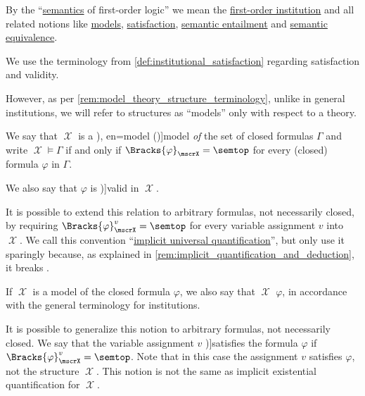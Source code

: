 \begin{definition}\label{def:fol_semantics}\mimprovised
  By the \enquote{\hyperref[con:syntax_semantics_duality]{semantics} of first-order logic} we mean the \hyperref[def:fol_institution]{first-order institution} and all related notions like \hyperref[def:institution/models]{models}, \hyperref[def:institution/satisfaction]{satisfaction}, \hyperref[def:institutional_entailment]{semantic entailment} and \hyperref[def:semantic_equivalence]{semantic equivalence}.

  \begin{thmenum}
     We use the terminology from \cref{def:institutional_satisfaction} regarding satisfaction and validity.

    However, as per \cref{rem:model_theory_structure_terminology}, unlike in general institutions, we will refer to structures as \enquote{models} only with respect to a theory.

    We say that \( \mscrX \) is a \term[ru=модель (\cite[2.6.21]{Герасимов2014Вычислимость}), en=model (\cite[def. def.2.2.13(ii)]{Hinman2005Logic})]{model} \emph{of} the set of closed formulas \( \Gamma \) and write \( \mscrX \vDash \Gamma \) if and only if \( \Bracks{\varphi}_\mscrX = \semtop \) for every (closed) formula \( \varphi \) in \( \Gamma \).

    We also say that \( \varphi \) is \term[en=valid (\cite[144]{VanDalen2004LogicAndStructure})]{valid} in \( \mscrX \).

    It is possible to extend this relation to arbitrary formulas, not necessarily closed, by requiring \( \Bracks{\varphi}_\mscrX^v = \semtop \) for every variable assignment \( v \) into \( \mscrX \). We call this convention \enquote{\hyperref[def:fol_implicit_universal_quantification]{implicit universal quantification}}, but only use it sparingly because, as explained in \cref{rem:implicit_quantification_and_deduction}, it breaks .

     If \( \mscrX \) is a model of the closed formula \( \varphi \), we also say that \( \mscrX \)  \( \varphi \), in accordance with the general terminology for institutions.

    It is possible to generalize this notion to arbitrary formulas, not necessarily closed. We say that the variable assignment \( v \) \term[en=satisfies (\cite[def. 2.1.23(i)]{Hinman2005Logic})]{satisfies} the formula \( \varphi \) if \( \Bracks{\varphi}_\mscrX^v = \semtop \). Note that in this case the assignment \( v \) satisfies \( \varphi \), not the structure \( \mscrX \). This notion is not the same as implicit existential quantification for \( \mscrX \).


\end{thmenum}
\end{definition}
